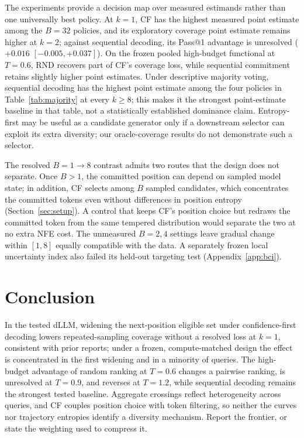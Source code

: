 \documentclass[11pt]{article}
\begin{document}
The experiments provide a decision map over measured estimands rather than one universally best policy. At $k=1$, CF has the highest measured point estimate among the $B=32$ policies, and its exploratory coverage point estimate remains higher at $k=2$; against sequential decoding, its Pass@1 advantage is unresolved ($+0.016$ $[-0.005,+0.037]$). On the frozen pooled high-budget functional at $T=0.6$, RND recovers part of CF's coverage loss, while sequential commitment retains slightly higher point estimates. Under descriptive majority voting, sequential decoding has the highest point estimate among the four policies in Table~\ref{tab:majority} at every $k\geq8$; this makes it the strongest point-estimate baseline in that table, not a statistically established dominance claim. Entropy-first may be useful as a candidate generator only if a downstream selector can exploit its extra diversity; our oracle-coverage results do not demonstrate such a selector.

The resolved $B=1\rightarrow8$ contrast admits two routes that the design does not separate. Once $B>1$, the committed position can depend on sampled model state; in addition, CF selects among $B$ sampled candidates, which concentrates the committed tokens even without differences in position entropy (Section~\ref{sec:setup}). A control that keeps CF's position choice but redraws the committed token from the same tempered distribution would separate the two at no extra NFE cost. The unmeasured $B=2,4$ settings leave gradual change within $[1,8]$ equally compatible with the data. A separately frozen local uncertainty index also failed its held-out targeting test (Appendix~\ref{app:bci}).

\section{Conclusion}

In the tested dLLM, widening the next-position eligible set under confidence-first decoding lowers repeated-sampling coverage without a resolved loss at $k=1$, consistent with prior reports; under a frozen, compute-matched design the effect is concentrated in the first widening and in a minority of queries. The high-budget advantage of random ranking at $T=0.6$ changes a pairwise ranking, is unresolved at $T=0.9$, and reverses at $T=1.2$, while sequential decoding remains the strongest tested baseline. Aggregate crossings reflect heterogeneity across queries, and CF couples position choice with token filtering, so neither the curves nor trajectory entropies identify a diversity mechanism. Report the frontier, or state the weighting used to compress it.
\end{document}

